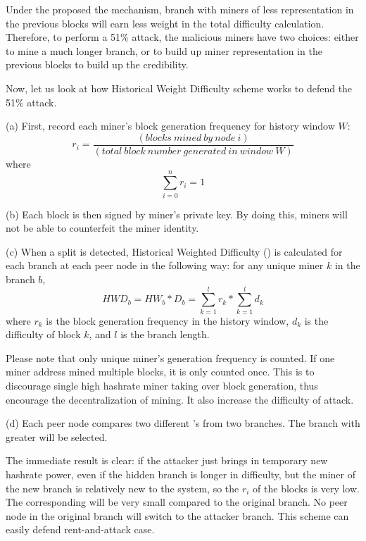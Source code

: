\documentclass[conference]{IEEEtran}
\begin{document}
Under the proposed the mechanism, branch with miners of less representation in the previous blocks will earn less weight in the total difficulty calculation. Therefore, to perform a 51\% attack, the malicious miners have two choices: either to mine a much longer branch, or to build up miner representation in the previous blocks to build up the credibility.

Now, let us look at how Historical Weight Difficulty scheme works to defend the 51\% attack. 

(a) First, record each miner’s block generation frequency for history window $W$:
\begin{equation}
r_i=\frac{(blocks\ mined\ by\ node\ i)}{(total\ block\ number\ generated\ in\ window\ W)}\label{eq_frequency_rate}
\end{equation}
where 
\begin{equation}
    \sum_{i=0}^{n}r_i = 1
    \label{eq_frequency_normalization}
\end{equation}

(b) Each block is then signed by miner's private key. By doing this, miners will not be able to counterfeit the miner identity.

(c) When a split is detected, Historical Weighted Difficulty () is calculated for each branch at each peer node in the following way: for any unique miner $k$ in the branch $b$,
\begin{equation}
    H\!W\!D_b = H\!W_b * \!D_b = \sum_{k=1}^{l}r_k*\sum_{k=1}^{l}d_k\label{eq_hwd}
\end{equation}
where $r_k$ is the block generation frequency in the history window, $d_k$ is the difficulty of block $k$, and $l$ is the branch length.

Please note that only unique miner's generation frequency is counted. If one miner address mined multiple blocks, it is only counted once. This is to discourage single high hashrate miner taking over block generation, thus encourage the decentralization of mining. It also increase the difficulty of attack.

(d) Each peer node compares two different 's from two branches. The branch with greater  will be selected.

The immediate result is clear: if the attacker just brings in temporary new hashrate power, even if the hidden branch is longer in difficulty, but the miner of the new branch is relatively new to the system, so the $r_i$ of the blocks is very low. The corresponding  will be very small compared to the original branch. No peer node in the original branch will switch to the attacker branch. This scheme can easily defend rent-and-attack case. 
\end{document}
